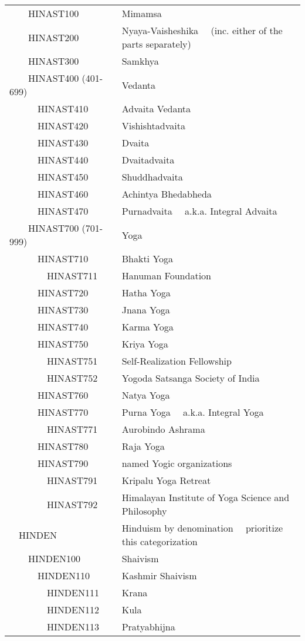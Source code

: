\documentclass[12pt]{article}
\begin{document}
\begin{tiny}
\begin{center}
\begin{longtable}{|l|l|}
~~~~HINAST100 & Mimamsa \\
~~~~HINAST200 & Nyaya-Vaisheshika	~~(inc. either of the parts separately) \\
~~~~HINAST300 & Samkhya \\
~~~~HINAST400 (401-699) & Vedanta \\
~~~~~~HINAST410 & Advaita Vedanta \\
~~~~~~HINAST420 & Vishishtadvaita \\
~~~~~~HINAST430 & Dvaita \\
~~~~~~HINAST440 & Dvaitadvaita \\
~~~~~~HINAST450 & Shuddhadvaita \\
~~~~~~HINAST460 & Achintya Bhedabheda \\
~~~~~~HINAST470 & Purnadvaita	~~a.k.a. Integral Advaita \\
~~~~HINAST700 (701-999) & Yoga \\
~~~~~~HINAST710 & Bhakti Yoga \\
~~~~~~~~HINAST711 & Hanuman Foundation \\
~~~~~~HINAST720 & Hatha Yoga \\
~~~~~~HINAST730 & Jnana Yoga \\
~~~~~~HINAST740 & Karma Yoga \\
~~~~~~HINAST750 & Kriya Yoga \\
~~~~~~~~HINAST751 & Self-Realization Fellowship \\
~~~~~~~~HINAST752 & Yogoda Satsanga Society of India \\
~~~~~~HINAST760 & Natya Yoga \\
~~~~~~HINAST770 & Purna Yoga	~~a.k.a. Integral Yoga \\
~~~~~~~~HINAST771 & Aurobindo Ashrama \\
~~~~~~HINAST780 & Raja Yoga \\
~~~~~~HINAST790 & named Yogic organizations \\
~~~~~~~~HINAST791 & Kripalu Yoga Retreat \\
~~~~~~~~HINAST792 & Himalayan Institute of Yoga Science and Philosophy \\
~~HINDEN & Hinduism by denomination	~~prioritize this categorization \\
~~~~HINDEN100 & Shaivism \\
~~~~~~HINDEN110 & Kashmir Shaivism \\
~~~~~~~~HINDEN111 & Krana \\
~~~~~~~~HINDEN112 & Kula \\
~~~~~~~~HINDEN113 & Pratyabhijna \\

\end{longtable}
\end{center}
\end{tiny}
\end{document}
